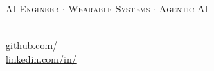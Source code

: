 \begin{center}
	\begin{minipage}[b]{.30\textwidth}
	\raggedright
	\footnotesize
	\city \\
	\phone \\
	\href{mailto:\email}{\email}
	\end{minipage}%
	\begin{minipage}[b]{.40\textwidth}
	\makeatletter
	\centering
	{\LARGE \textbf{\@author}} \\[0.18em]
	{\scshape \scriptsize \color{highlight} AI Engineer $\cdot$ Wearable Systems $\cdot$ Agentic AI}
	\makeatother
	\end{minipage}%
	\begin{minipage}[b]{.30\textwidth}
	\raggedleft
	\footnotesize
	\href{https://\portfolio}{\portfolio} \\
	\href{https://github.com/\github}{github.com/\github} \\
	\href{https://linkedin.com/in/\LinkedIn}{linkedin.com/in/\LinkedIn}
	\end{minipage}
\end{center}
\vspace{-0.75em}
